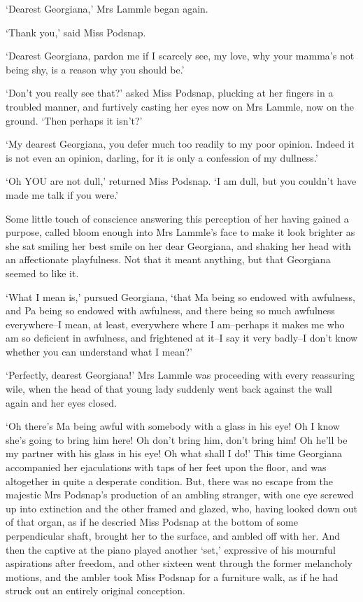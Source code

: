 ‘Dearest Georgiana,’ Mrs Lammle began again.

‘Thank you,’ said Miss Podsnap.

‘Dearest Georgiana, pardon me if I scarcely see, my love, why your
mamma’s not being shy, is a reason why you should be.’

‘Don’t you really see that?’ asked Miss Podsnap, plucking at her fingers
in a troubled manner, and furtively casting her eyes now on Mrs Lammle,
now on the ground. ‘Then perhaps it isn’t?’

‘My dearest Georgiana, you defer much too readily to my poor opinion.
Indeed it is not even an opinion, darling, for it is only a confession
of my dullness.’

‘Oh YOU are not dull,’ returned Miss Podsnap. ‘I am dull, but you
couldn’t have made me talk if you were.’

Some little touch of conscience answering this perception of her having
gained a purpose, called bloom enough into Mrs Lammle’s face to make it
look brighter as she sat smiling her best smile on her dear Georgiana,
and shaking her head with an affectionate playfulness. Not that it meant
anything, but that Georgiana seemed to like it.

‘What I mean is,’ pursued Georgiana, ‘that Ma being so endowed with
awfulness, and Pa being so endowed with awfulness, and there being
so much awfulness everywhere--I mean, at least, everywhere where I
am--perhaps it makes me who am so deficient in awfulness, and frightened
at it--I say it very badly--I don’t know whether you can understand what
I mean?’

‘Perfectly, dearest Georgiana!’ Mrs Lammle was proceeding with every
reassuring wile, when the head of that young lady suddenly went back
against the wall again and her eyes closed.

‘Oh there’s Ma being awful with somebody with a glass in his eye! Oh I
know she’s going to bring him here! Oh don’t bring him, don’t bring him!
Oh he’ll be my partner with his glass in his eye! Oh what shall I do!’
This time Georgiana accompanied her ejaculations with taps of her feet
upon the floor, and was altogether in quite a desperate condition. But,
there was no escape from the majestic Mrs Podsnap’s production of an
ambling stranger, with one eye screwed up into extinction and the other
framed and glazed, who, having looked down out of that organ, as if he
descried Miss Podsnap at the bottom of some perpendicular shaft, brought
her to the surface, and ambled off with her. And then the captive at the
piano played another ‘set,’ expressive of his mournful aspirations after
freedom, and other sixteen went through the former melancholy motions,
and the ambler took Miss Podsnap for a furniture walk, as if he had
struck out an entirely original conception.

